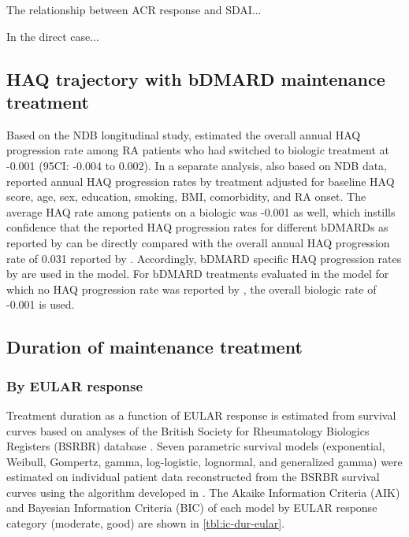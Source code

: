 \documentclass[11pt,final,fleqn]{article}\usepackage[]{graphicx}\usepackage[]{color}
\theoremstyle{plain}
\begin{document}
The relationship between ACR response and SDAI...

In the direct case...

\subsection{HAQ trajectory with bDMARD maintenance treatment}
Based on the NDB longitudinal study, \citet{wolfe2010loss} estimated the overall annual HAQ progression rate among RA patients who had switched to biologic treatment at -0.001 (95CI: -0.004 to 0.002). In a separate analysis, also based on NDB data, \citet{michaud2011treatment} reported annual HAQ progression rates by treatment adjusted for baseline HAQ score, age, sex, education, smoking, BMI, comorbidity, and RA onset. The average HAQ rate among patients on a biologic was -0.001 as well, which instills confidence that the reported HAQ progression rates for different bDMARDs as reported by \citet{michaud2011treatment} can be directly compared with the overall annual HAQ progression rate of 0.031 reported by \citet{wolfe2010loss}. Accordingly, bDMARD specific HAQ progression rates by \citet{michaud2011treatment} are used in the model. For bDMARD treatments evaluated in the model for which no HAQ progression rate was reported by \citet{michaud2011treatment}, the overall biologic rate of -0.001 is used. 

\subsection{Duration of maintenance treatment}\label{duration-of-maintenance-treatment}
\subsubsection{By EULAR response}\label{by-eular-response}
Treatment duration as a function of EULAR response is estimated from survival curves based on analyses of the British Society for Rheumatology Biologics Registers (BSRBR) database \citep{stevenson2016adalimumab}. Seven parametric survival models (exponential, Weibull, Gompertz, gamma, log-logistic, lognormal, and generalized gamma) were estimated on individual patient data reconstructed from the BSRBR survival curves using the algorithm developed in \citet{guyot2012enhanced}. The Akaike Information Criteria (AIK) and Bayesian Information Criteria (BIC) of each model by EULAR response category (moderate, good) are shown in \autoref{tbl:ic-dur-eular}.
\end{document}
